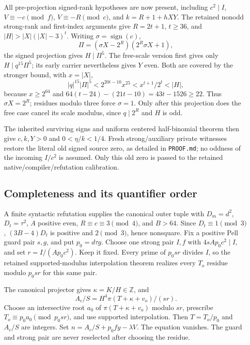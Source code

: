 All pre-projection signed-rank hypotheses are now present, including
\(c^2\mid I\), \(V\equiv-c\pmod f\), \(V\equiv-R\pmod c\), and
\(k=R+1+hXY\). The retained nonodd strong-rank and first-index arguments
give \(R=2t+1\), \(t\ge36\), and
\( |H|>|X|(|X|-3)^t\). Writing \(\sigma=\operatorname{sign}(c)\),
\[
 \Pi=(\sigma X-2^R)(2^R\sigma X+1),
\]
the signed projection gives \(H\mid\Pi^5\). The free-scale version first
gives only \(H\mid q^{15}\Pi^5\); its early carrier nevertheless gives
\(Y\) even. Both are covered by the stronger bound, with \(x=|X|\),
\[
 |q|^{15}|\Pi|^5<2^{20t-10}x^{25}<x^{t+1}/2^t<|H|,
\]
because \(x\ge2^{64}\) and
\(64(t-24)-(21t-10)=43t-1526\ge22\).
Thus \(\sigma X=2^R\); residues modulo three force \(\sigma=1\).
Only after this projection does the free case cancel its scale modulus,
since \(q\mid2^R\) and \(H\) is odd.

The inherited surviving signs and uniform centered half-binomial theorem
then give \(c,k,Y>0\) and \(0<\eta/k<1/4\). Fresh strong/auxiliary
private witnesses restore the literal old signed source zero, as detailed
in \texttt{PROOF.md}; no oddness of the incoming \(I/c^2\) is assumed.
Only this old zero is passed to the retained native/compiler/refutation
calibration.

\subsection{Completeness and its quantifier order}
A finite syntactic refutation supplies the canonical outer tuple with
\(D_m=d^2\), \(D_t=\tau^2\), \(A\) positive even,
\(R\equiv c\equiv3\pmod4\), and \(B>64\).
Since \(D_t\equiv1\pmod3\), \((3B-4)D_t\) is positive and
\(2\pmod3\), hence nonsquare. Fix a positive Pell guard pair \(s,g\),
and put \(p_0=d\tau g\). Choose one strong pair \(I,f\) with
\(4sAp_0c^2\mid I\), and set \(r=I/(Ap_0c^2)\). Keep it fixed.
Every prime of \(p_0sr\) divides \(I\), so the retained
supported-modulus interpolation theorem realizes every \(T_o\) residue
modulo \(p_0sr\) for this same pair.

The canonical projector gives \(\kappa=K/H\in\mathbb Z\), and
\[
 A_c/S=H^4\pi(T+\kappa+v_o)/(sr).
\]
Choose an intersective root \(a_0\) of \(\pi(T+\kappa+v_o)\) modulo
\(sr\), prescribe \(T_o\equiv p_0a_0\pmod{p_0sr}\), and use supported
interpolation. Then \(T=T_o/p_0\) and \(A_c/S\) are integers. Set
\(n=A_c/S+p_0fy-\lambda V\). The equation vanishes. The guard and
strong pair are never reselected after choosing the residue.

